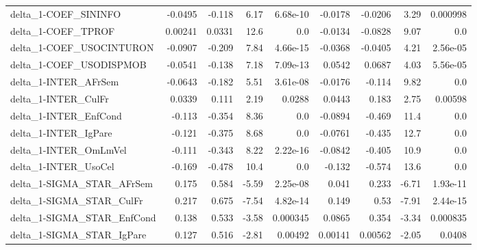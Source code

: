\begin{tabular}{lrrrrrrrr}
delta\_1-COEF\_SININFO                  &     -0.0495 &       -0.118 &    6.17 & 6.68e-10 &    -0.0178 &     -0.0206 &         3.29 &      0.000998 \\
delta\_1-COEF\_TPROF                    &     0.00241 &       0.0331 &    12.6 &      0.0 &    -0.0134 &     -0.0828 &         9.07 &           0.0 \\
delta\_1-COEF\_USOCINTURON              &     -0.0907 &       -0.209 &    7.84 & 4.66e-15 &    -0.0368 &     -0.0405 &         4.21 &      2.56e-05 \\
delta\_1-COEF\_USODISPMOB               &     -0.0541 &       -0.138 &    7.18 & 7.09e-13 &     0.0542 &      0.0687 &         4.03 &      5.56e-05 \\
delta\_1-INTER\_AFrSem                  &     -0.0643 &       -0.182 &    5.51 & 3.61e-08 &    -0.0176 &      -0.114 &         9.82 &           0.0 \\
delta\_1-INTER\_CulFr                   &      0.0339 &        0.111 &    2.19 &   0.0288 &     0.0443 &       0.183 &         2.75 &       0.00598 \\
delta\_1-INTER\_EnfCond                 &      -0.113 &       -0.354 &    8.36 &      0.0 &    -0.0894 &      -0.469 &         11.4 &           0.0 \\
delta\_1-INTER\_IgPare                  &      -0.121 &       -0.375 &    8.68 &      0.0 &    -0.0761 &      -0.435 &         12.7 &           0.0 \\
delta\_1-INTER\_OmLmVel                 &      -0.111 &       -0.343 &    8.22 & 2.22e-16 &    -0.0842 &      -0.405 &         10.9 &           0.0 \\
delta\_1-INTER\_UsoCel                  &      -0.169 &       -0.478 &    10.4 &      0.0 &     -0.132 &      -0.574 &         13.6 &           0.0 \\
delta\_1-SIGMA\_STAR\_AFrSem             &       0.175 &        0.584 &   -5.59 & 2.25e-08 &      0.041 &       0.233 &        -6.71 &      1.93e-11 \\
delta\_1-SIGMA\_STAR\_CulFr              &       0.217 &        0.675 &   -7.54 & 4.82e-14 &      0.149 &        0.53 &        -7.91 &      2.44e-15 \\
delta\_1-SIGMA\_STAR\_EnfCond            &       0.138 &        0.533 &   -3.58 & 0.000345 &     0.0865 &       0.354 &        -3.34 &      0.000835 \\
delta\_1-SIGMA\_STAR\_IgPare             &       0.127 &        0.516 &   -2.81 &  0.00492 &    0.00141 &     0.00562 &        -2.05 &        0.0408 \\

\end{tabular}
